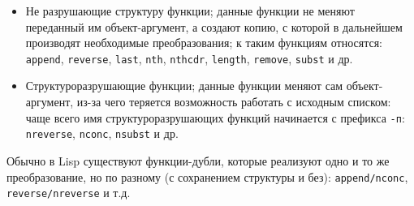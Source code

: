 \begin{itemize}
    \item Не разрушающие структуру функции; данные функции не меняют переданный
          им объект-аргумент, а создают копию, с которой в дальнейшем
          производят необходимые преобразования; к таким функциям
          относятся: \verb|append|, \verb|reverse|, \verb|last|,
          \verb|nth|, \verb|nthcdr|, \verb|length|, \verb|remove|,
          \verb|subst| и др.
    \item Структуроразрушающие функции; данные функции меняют сам
          объект-аргумент, из-за чего теряется возможность работать с исходным
          списком: чаще всего имя структуроразрушающих функций начинается
          с префикса \verb|-п|: \verb|nreverse|, \verb|nconc|, \verb|nsubst|
          и др.
\end{itemize}

Обычно в Lisp существуют функции-дубли, которые реализуют одно и то же
преобразование, но по разному (с сохранением структуры и без):
\verb|append/nconc|, \verb|reverse/nreverse| и т.д.

